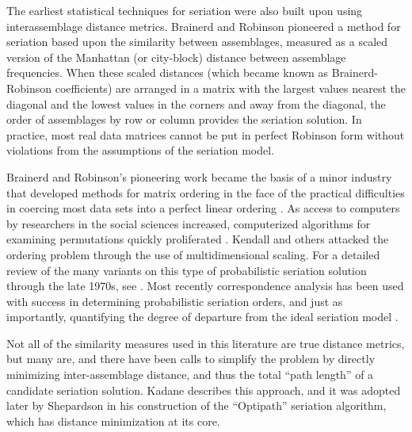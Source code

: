 The earliest statistical techniques for seriation were also built upon
using interassemblage distance metrics. Brainerd and Robinson
\citep{Brainerd1951, Robinson1951} pioneered a method for seriation
based upon the similarity between assemblages, measured as a scaled
version of the Manhattan (or city-block) distance between assemblage
frequencies. When these scaled distances (which became known as
Brainerd-Robinson coefficients) are arranged in a matrix with the
largest values nearest the diagonal and the lowest values in the corners
and away from the diagonal, the order of assemblages by row or column
provides the seriation solution. In practice, most real data matrices
cannot be put in perfect Robinson form without violations from the
assumptions of the seriation model.

Brainerd and Robinson's pioneering work became the basis of a minor
industry that developed methods for matrix ordering in the face of the
practical difficulties in coercing most data sets into a perfect linear
ordering
\citep[e.g.,][]{dempsey1963statistical, Kendall1963, Matthews1963, Bordaz1970aa, Gardin1970, Kendall1970, Kendall1971}.
As access to computers by researchers in the social sciences increased,
computerized algorithms for examining permutations quickly proliferated
\citep{Ascher1963, craytor1968refinements, Kuzara1966}. Kendall
\citeyearpar{Kendall1969} and others attacked the ordering problem
through the use of multidimensional scaling. For a detailed review of
the many variants on this type of probabilistic seriation solution
through the late 1970s, see \citep{Marquardt:1978aa}. Most recently
correspondence analysis has been used with success in determining
probabilistic seriation orders, and just as importantly, quantifying the
degree of departure from the ideal seriation model \citep{Smith2005}.

Not all of the similarity measures used in this literature are true
distance metrics, but many are, and there have been calls to simplify
the problem by directly minimizing inter-assemblage distance, and thus
the total ``path length'' of a candidate seriation solution. Kadane
\citeyearpar{Kadane1971} describes this approach, and it was adopted
later by Shepardson \citeyearpar{shepardson2006} in his construction of
the ``Optipath'' seriation algorithm, which has distance minimization at
its core.

